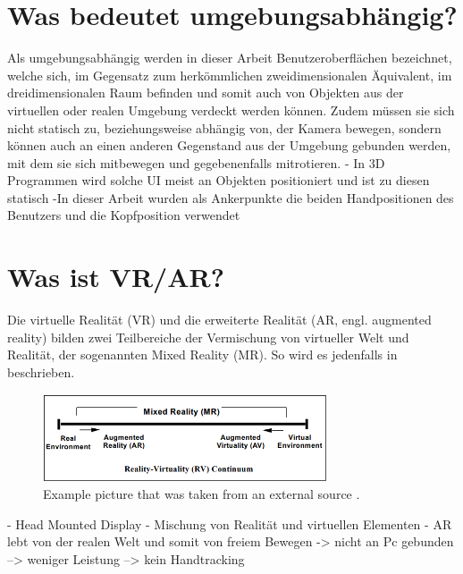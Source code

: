 	\section{Was bedeutet umgebungsabhängig?}
		Als umgebungsabhängig werden in dieser Arbeit Benutzeroberflächen bezeichnet, welche sich, im Gegensatz zum herkömmlichen zweidimensionalen Äquivalent, im dreidimensionalen Raum befinden und somit auch von Objekten aus der virtuellen oder realen Umgebung verdeckt werden können. Zudem müssen sie sich nicht statisch zu, beziehungsweise abhängig von, der Kamera bewegen, sondern können auch an einen anderen Gegenstand aus der Umgebung gebunden werden, mit dem sie sich mitbewegen und gegebenenfalls mitrotieren.
		- In 3D Programmen wird solche UI meist an Objekten positioniert und ist zu diesen statisch
		-In dieser Arbeit wurden als Ankerpunkte die beiden Handpositionen des Benutzers und die Kopfposition verwendet
	
	\section{Was ist VR/AR?}
		Die virtuelle Realität (VR) und die erweiterte Realität (AR, engl. augmented reality)  bilden zwei Teilbereiche der Vermischung von virtueller Welt und Realität, der sogenannten Mixed Reality (MR). So wird es jedenfalls in  beschrieben. 
		
		\begin{figure}[htbp]
			\centering
			\includegraphics[width=0.75\textwidth]{figures/mixed_reality.png}
			\caption{Example picture that was taken from an external source .}
			\label{fig:mixed_reality}
		\end{figure}
		
		- Head Mounted Display
		- Mischung von Realität und virtuellen Elementen
		- AR lebt von der realen Welt und somit von freiem Bewegen
		-> nicht an Pc gebunden
		--> weniger Leistung
		--> kein Handtracking